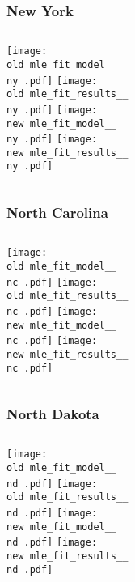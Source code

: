 \documentclass{beamer}
\newcommand{\old}{current_two_stage_output/pyseir/state_summaries/reports/}
\newcommand{\new}{new_shortest_t_delta/pyseir/state_summaries/reports/}
\newcommand{\ny}{New York__36}
\newcommand{\nc}{North Carolina__37}
\newcommand{\nd}{North Dakota__38}
\begin{document}
\begin{frame}
\frametitle{New York}
    \begin{columns}[t]

       \texttt{[image: \\old mle\_fit\_model\_\_\\ny .pdf]}
       \texttt{[image: \\old mle\_fit\_results\_\_\\ny .pdf]}   
       \texttt{[image: \\new mle\_fit\_model\_\_\\ny .pdf]}
       \texttt{[image: \\new mle\_fit\_results\_\_\\ny .pdf]}   
\end{columns}
\end{frame}

\begin{frame}
\frametitle{North Carolina}
    \begin{columns}[t]

       \texttt{[image: \\old mle\_fit\_model\_\_\\nc .pdf]}
       \texttt{[image: \\old mle\_fit\_results\_\_\\nc .pdf]}   
       \texttt{[image: \\new mle\_fit\_model\_\_\\nc .pdf]}
       \texttt{[image: \\new mle\_fit\_results\_\_\\nc .pdf]}   
\end{columns}
\end{frame}

\begin{frame}
\frametitle{North Dakota}
    \begin{columns}[t]

       \texttt{[image: \\old mle\_fit\_model\_\_\\nd .pdf]}
       \texttt{[image: \\old mle\_fit\_results\_\_\\nd .pdf]}   
       \texttt{[image: \\new mle\_fit\_model\_\_\\nd .pdf]}
       \texttt{[image: \\new mle\_fit\_results\_\_\\nd .pdf]}   
\end{columns}
\end{frame}
\end{document}
